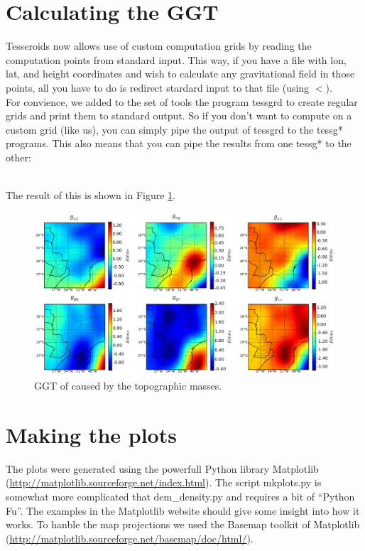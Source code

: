\documentclass[a4paper]{article}
\begin{document}


\section{Calculating the GGT}

Tesseroids now allows use of custom computation grids by reading the computation
points from standard input. This way, if you have a file with lon, lat, and height
coordinates and wish to calculate any gravitational field in those points, all you
have to do is redirect stardard input to that file (using $<$).
\\
\indent For convience, we added to the set of tools the program tessgrd to create regular
grids and print them to standard output. So if you don't want to compute on a
custom grid (like us), you can simply pipe the output of tessgrd to the tessg* programs.
This also means that you can pipe the results from one tessg* to the other:



\hfill\\
\noindent The result of this is shown in Figure \ref{fig:dem-ggt}.

\begin{figure}[htb]
    \centering
        \includegraphics[width=\textwidth]{dem-10min-ggt.png}
    \caption{GGT of caused by the topographic masses.
    \label{fig:dem-ggt}}
\end{figure}

\section{Making the plots}

The plots were generated using the powerfull Python library Matplotlib
(\url{http://matplotlib.sourceforge.net/index.html}).
The script mkplots.py is somewhat more complicated that dem\_density.py and requires
a bit of ``Python Fu''. The examples in the Matplotlib website should give some
insight into how it works.
To hanble the map projections we used the Basemap toolkit of Matplotlib
(\url{http://matplotlib.sourceforge.net/basemap/doc/html/}).
\end{document}
